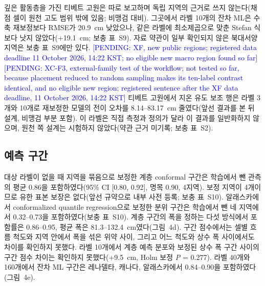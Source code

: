 깊은 활동층을 가진 티베트 고원은 따로 보고하며 독립 지역의 근거로 쓰지 않는다(채점 셀이 원천 고도 범위 밖에 있음; 비맹검 대비).
그곳에서 라벨 10개의 잔차 ML은 수축 재보정보다 RMSE가 20.9~cm 낮았으나, 같은 라벨에 최소제곱으로 맞춘 Stefan 식보다 낫지 않았다(+19.1~cm; 보충 표~S9).
자료 약관이 일부 확인되지 않은 북대서양 지역은 보충 표~S9에만 있다.
\textcolor{blue}{[PENDING: XF, new public regions; registered data deadline 11 October 2026, 14:22 KST; no eligible new macro region found so far]}
\textcolor{blue}{[PENDING: XC-F3, external-family test of the workflow; not tested so far, because placement reduced to random sampling makes its ten-label contrast identical, and no eligible new region; registered sentence after the XF data deadline, 11 October 2026, 14:22 KST]}
티베트 고원에서 지온 유도 보조 행은 라벨 3개와 10개로 재보정한 모델의 전이 오차를 8.14--83.17~cm 줄였다(앞선 결과를 본 뒤 설계, 비맹검 부분 포함). 이 라벨은 직접 측정과 정의가 달라 이 결과를 일반화하지 않으며, 원천 쪽 설계는 시험하지 않았다(약관 근거 미기록; 보충 표~S2).

\subsection{예측 구간}
\label{sec:results-intervals}

대상 라벨이 없을 때 지역을 묶음으로 보정한 계층 conformal 구간\cite{Dunn2023}은 학습에서 뺀 관측의 평균 0.86을 포함하였다(95\% CI [0.80, 0.92], 명목 0.90, 4지역). 보정 지역이 4개이므로 유한 표본 보장은 없다(앞선 규약으로 내부 사전 등록; 보충 표~S10).
알래스카에서 conformalized quantile regression으로 보정한 분위 구간\cite{romano2019_conformalized_quantile_regression}은 학습에서 뺀 네 지역에서 0.32--0.73을 포함하였다(보충 표~S10).
계층 구간의 폭을 정하는 다섯 방식에서 포함률은 0.86--0.95, 평균 폭은 81.3--132.4~cm였다(그림~4d).
구간 점수\cite{GneitingRaftery2007}에서는 셀별 흐름 척도와 지역 안에서 폭을 섞은 위약 사이, 그리고 어느 척도와 상수 폭 사이에서도 차이를 확인하지 못했다.
라벨 10개에서 계층 예측 분포와 보정된 상수 폭 구간 사이의 구간 점수 차이는 확인하지 못했다(+9.5~cm, Holm 보정 \textit{P} = 0.277).
라벨 40개와 160개에서 잔차 ML 구간은 레나델타, 캐나다, 알래스카에서 0.84--0.90을 포함하였다(그림~4e).
